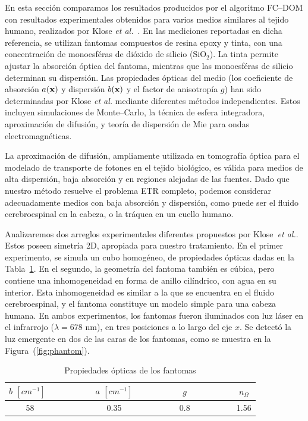 En esta sección comparamos los resultados producidos por el algoritmo FC--DOM 
con resultados experimentales obtenidos para varios 
medios similares al tejido humano, realizados por Klose \textit{et al.}~\cite{Klose2002}. 
En las mediciones reportadas en dicha referencia, 
se utilizan fantomas compuestos de resina epoxy y tinta, 
con una concentración de monoesféras de dióxido de silicio ($\text{SiO}_2$). 
La tinta permite ajustar la absorción óptica del fantoma, 
mientras que las monoesféras de silicio determinan su dispersión. 
Las propiedades ópticas del medio (los coeficiente de absorción $a(\mathbf{x})$
y dispersión $b(\mathbf{x})$ y el 
factor de anisotropía $g$) han sido determinadas por Klose \textit{et al.} mediante 
diferentes métodos independientes. Estos incluyen simulaciones de Monte--Carlo, 
la técnica de esfera integradora, aproximación de difusión, y teoría de 
dispersión de Mie para ondas electromagnéticas. 

La aproximación de difusión, ampliamente utilizada en tomografía óptica para el 
modelado de transporte de fotones en el tejido biológico, 
es válida para medios de alta dispersión,  
baja absorción y en regiones alejadas de las fuentes.
Dado que nuestro método resuelve el problema ETR completo, podemos considerar adecuadamente 
medios con baja absorción y dispersión, como puede ser el fluido cerebroespinal 
en la cabeza, o la tráquea en un cuello humano. 

Analizaremos dos arreglos experimentales diferentes propuestos por Klose~\textit{et al.}. 
Estos poseen simetría 2D, apropiada para nuestro tratamiento. 
 En el primer experimento, se simula un cubo homogéneo, de propiedades ópticas dadas en 
 la Tabla~\ref{tab:tabopt}.
 En el segundo, la geometría del fantoma también 
 es cúbica, pero contiene una inhomogeneidad en forma 
 de anillo cilíndrico, con agua en su interior. Esta inhomogeneidad 
 es similar a la que se encuentra en 
 el fluido cerebroespinal, y el fantoma constituye un modelo 
 simple para una cabeza humana. En ambos experimentos,
los fantomas fueron iluminados con luz láser en el 
infrarrojo ($\lambda = 678$ nm), en tres posiciones a lo largo del eje $x$. Se detectó la luz emergente 
en dos de las caras de los fantomas, como se muestra en la Figura~(\ref{fig:phantom}).

 
 \begin{table}[h!]
\caption{Propiedades ópticas de los fantomas}
\vspace{-0.6cm}
\begin{center}
\begin{tabular}{cccc}
\hline
$b$ $[cm^{-1}]$ ~~~~~~~~ & $a$ $[cm^{-1}]$ & ~~~~~~~~ $g$  ~~~~~~~~ & $n_{\Omega}$ \\
\hline
58 ~~~~~~~~ & 0.35 & ~~~~~~~~  0.8 ~~~~~~~~ & 1.56 \\
\hline
\end{tabular}
\label{tab:tabopt}
\end{center}
\end{table}

